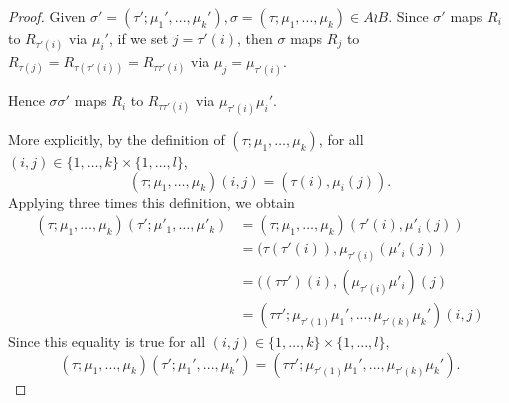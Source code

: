 \documentclass[11pt,a4paper]{article}
\begin{document}
\begin{proof}
Given $\sigma'=(\tau';\mu_1',...,\mu_k'),\sigma=(\tau;\mu_1,...,\mu_k)\in A\wr B$. Since $\sigma'$ maps $R_i$ to $R_{\tau'(i)}$ via $\mu_i'$, if we set $j=\tau'(i)$, then $\sigma$ maps $R_j$ to $R_{\tau(j)}=R_{\tau(\tau'(i))}=R_{\tau\tau'(i)}$ via $\mu_j=\mu_{\tau'(i)}$.

Hence $\sigma\sigma'$ maps $R_i$ to $R_{\tau\tau'(i)}$ via $\mu_{\tau'(i)}\mu_i'$.

More explicitly, by the definition of $(\tau; \mu_1,\ldots,\mu_k)$, for all $(i,j) \in \{1,\ldots,k\} \times \{1,\ldots,l\}$,
$$(\tau;\mu_1,\ldots,\mu_k)(i,j) = (\tau(i), \mu_i(j)).$$
Applying three times this definition, we obtain
\begin{align*}
(\tau; \mu_1,\ldots,\mu_k)(\tau'; \mu'_1,\ldots,\mu'_k)&= (\tau; \mu_1,\ldots,\mu_k)(\tau'(i),\mu'_i(j))\\
&= (\tau( \tau'(i)), \mu_{\tau'(i)}(\mu'_i(j))\\
&= ((\tau \tau')(i), (\mu_{\tau'(i)} \mu'_i)(j)\\
&=(\tau\tau';\mu_{\tau'(1)}\mu_1',...,\mu_{\tau'(k)}\mu_k')(i,j)
\end{align*}
Since this equality is true for all $(i,j) \in \{1,\ldots,k\} \times \{1,\ldots,l\}$,
$$(\tau;\mu_1,...,\mu_k)(\tau';\mu_1',...,\mu_k')=(\tau\tau';\mu_{\tau'(1)}\mu_1',...,\mu_{\tau'(k)}\mu_k').$$
\end{proof}
\end{document}
